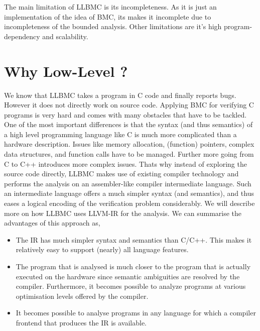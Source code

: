 \documentclass[14pt]{article}
\begin{document}
{The main limitation of LLBMC is its incompleteness. As it is just an implementation of the idea of BMC, its makes it incomplete due to incompleteness of the bounded analysis. Other limitations are it's high program-dependency and scalability. 

\section{Why Low-Level ?}\label{Low-Level}
We know that LLBMC takes a program in C code and finally reports bugs. However it does not directly work on source code. Applying BMC for verifying C programs is very hard and comes with many obstacles that have to be tackled. One of the most important differences is that the syntax (and thus semantics) of a high level programming language like C is much more complicated than a hardware description. Issues like memory allocation, (function) pointers, complex data structures, and function calls have to be managed. Further more going from C to C++ introduces more complex issues. Thats why instead of exploring the source code directly, LLBMC makes use of existing compiler technology and performs the analysis on an assembler-like compiler intermediate language. Such an intermediate language offers a much simpler syntax (and semantics), and thus eases a logical encoding of the verification problem considerably. We will describe more on how LLBMC uses LLVM-IR for the analysis. We can summarise the advantages of this approach as,
\begin{itemize}
   \item The IR has much simpler syntax and semantics than C/C++. This makes it relatively easy to support (nearly) all language features.
     \item The program that is analysed is much closer to the program that is actually executed on the hardware since semantic ambiguities are resolved by the compiler. Furthermore, it becomes possible to analyze programs at various optimisation levels offered by the compiler.
  \item It becomes possible to analyse programs in any language for which a compiler frontend that produces the IR is available.
  
\end{itemize}

}
\end{document}
